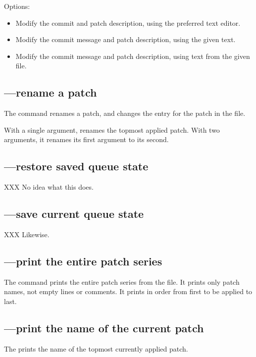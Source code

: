 Options:
\begin{itemize}
\item[\hgopt{qrefresh}{-e}] Modify the commit and patch description,
  using the preferred text editor.
\item[\hgopt{qrefresh}{-m}] Modify the commit message and patch
  description, using the given text.
\item[\hgopt{qrefresh}{-l}] Modify the commit message and patch
  description, using text from the given file.
\end{itemize}

\subsection{---rename a patch}

The  command renames a patch, and changes the entry for
the patch in the  file.

With a single argument,  renames the topmost applied
patch.  With two arguments, it renames its first argument to its
second.

\subsection{---restore saved queue state}

XXX No idea what this does.

\subsection{---save current queue state}

XXX Likewise.

\subsection{---print the entire patch series}

The  command prints the entire patch series from the
 file.  It prints only patch names, not empty lines
or comments.  It prints in order from first to be applied to last.

\subsection{---print the name of the current patch}

The  prints the name of the topmost currently applied
patch.

